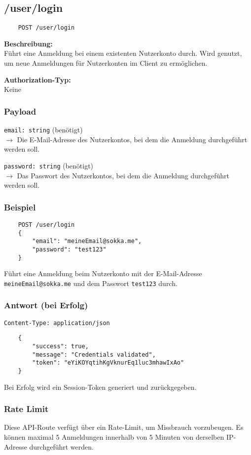 \subsection{/user/login}
\label{appauth}

\begin{lstlisting}
    POST /user/login
\end{lstlisting}

\textbf{Beschreibung:} \\
Führt eine Anmeldung bei einem existenten Nutzerkonto durch. Wird genutzt, um neue Anmeldungen für Nutzerkonten im Client zu ermöglichen.

\textbf{Authorization-Typ:} \\
Keine

\subsubsection{Payload}

\lstinline{email: string} (benötigt) \\
$\rightarrow$ Die E-Mail-Adresse des Nutzerkontos, bei dem die Anmeldung durchgeführt werden soll.

\lstinline{password: string} (benötigt) \\
$\rightarrow$ Das Passwort des Nutzerkontos, bei dem die Anmeldung durchgeführt werden soll.

\subsubsection{Beispiel}

\begin{lstlisting}
    POST /user/login
    {
        "email": "meineEmail@sokka.me",
        "password": "test123"
    }
\end{lstlisting}

Führt eine Anmeldung beim Nutzerkonto mit der E-Mail-Adresse \lstinline{meineEmail@sokka.me} und dem Passwort \lstinline{test123} durch.

\subsubsection{Antwort (bei Erfolg)}

\lstinline{Content-Type: application/json}
\begin{lstlisting}
    {
        "success": true, 
        "message": "Credentials validated",
        "token": "eYiKOYqtihKgVknurEq1luc3mhawIxAo"
    }
\end{lstlisting}

Bei Erfolg wird ein Session-Token generiert und zurückgegeben.

\subsubsection{Rate Limit}

Diese API-Route verfügt über ein Rate-Limit, um Missbrauch vorzubeugen. Es können maximal 5 Anmeldungen innerhalb von 5 Minuten von derselben IP-Adresse durchgeführt werden.